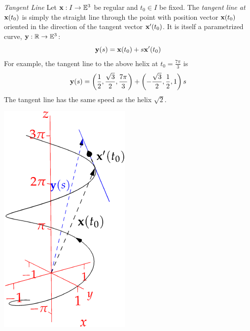 \begin{tcolorbox}[exstyle,title={}]
\begin{description}
		\begin{minipage}[t]{0.72\linewidth}\vspace{0pt}
		  \item[\normalfont\emph{Tangent Line}] Let ${\mathbf{x}}:I\to\mathbb{E}^3$ be regular and $t_0\in I$ be fixed. The \emph{tangent line at ${\mathbf{x}}(t_0)$} is simply the straight line through the point with position vector ${\mathbf{x}}(t_0)$ oriented in the direction of the tangent vector ${\mathbf{x}}'(t_0)$. It is itself a parametrized curve, ${\mathbf{y}}:\mathbb{R}\to\mathbb{E}^3$:
			\[
				{\mathbf{y}}(s)={\mathbf{x}}(t_0)+s{\mathbf{x}}'(t_0)
			\]
			For example, the tangent line to the above helix at $t_0=\frac{7\pi}3$ is
			\[
				{\mathbf{y}}(s)=\left(\frac 12,\frac{\sqrt 3}2,\frac{7\pi}3\right)+\left(-\frac{\sqrt 3}2,\frac 12,1\right)s
			\]
			The tangent line has the same speed as the helix $\sqrt 2$.
		\end{minipage}
		\hfill
		\begin{minipage}[t]{0.27\linewidth}\vspace{0pt}
			\flushright	\href{http://www.math.uci.edu/~ndonalds/math162a/curves-helixnewtan.html}{\includegraphics[scale=0.95]{curves-helixnewtan}}
		\end{minipage}\par
	

\end{description}
\end{tcolorbox}
